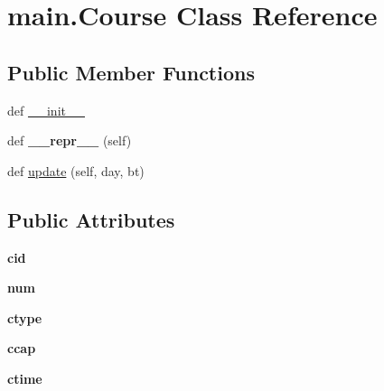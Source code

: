 \hypertarget{classmain_1_1_course}{}\section{main.\+Course Class Reference}
\label{classmain_1_1_course}
\subsection*{Public Member Functions}
\begin{DoxyCompactItemize}
\item 
def \hyperlink{classmain_1_1_course_af58adc0f68774dd210b3866317334635}{\+\_\+\+\_\+init\+\_\+\+\_\+}
\item 
\hypertarget{classmain_1_1_course_ab44b5ad760c8e25554ac80df4e71a596}{}def {\bfseries \+\_\+\+\_\+repr\+\_\+\+\_\+} (self)\label{classmain_1_1_course_ab44b5ad760c8e25554ac80df4e71a596}

\item 
def \hyperlink{classmain_1_1_course_a073e4a06e67b4079e8c6548e9c84e7ce}{update} (self, day, bt)
\end{DoxyCompactItemize}
\subsection*{Public Attributes}
\begin{DoxyCompactItemize}
\item 
\hypertarget{classmain_1_1_course_af7e97c78e19088f59ef0ee1529a1c69d}{}{\bfseries cid}\label{classmain_1_1_course_af7e97c78e19088f59ef0ee1529a1c69d}

\item 
\hypertarget{classmain_1_1_course_a6b039e5b92476f73cb431e9cdf60a129}{}{\bfseries num}\label{classmain_1_1_course_a6b039e5b92476f73cb431e9cdf60a129}

\item 
\hypertarget{classmain_1_1_course_a7af8b2fa9edd8940bffcf374f8f71da7}{}{\bfseries ctype}\label{classmain_1_1_course_a7af8b2fa9edd8940bffcf374f8f71da7}

\item 
\hypertarget{classmain_1_1_course_a44462f3c99bde68de74359c51093b7b2}{}{\bfseries ccap}\label{classmain_1_1_course_a44462f3c99bde68de74359c51093b7b2}

\item 
\hypertarget{classmain_1_1_course_abe5485cf7e159fbfbe02c5810f971fc1}{}{\bfseries ctime}\label{classmain_1_1_course_abe5485cf7e159fbfbe02c5810f971fc1}

\end{DoxyCompactItemize}


